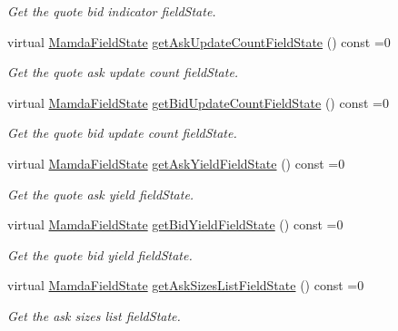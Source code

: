 \begin{CompactItemize}
\begin{CompactList}\small\item\em Get the quote bid indicator field\-State. \item\end{CompactList}\item 
virtual \hyperlink{namespaceWombat_93aac974f2ab713554fd12a1fa3b7d2a}{Mamda\-Field\-State} \hyperlink{classWombat_1_1MamdaQuoteRecap_c9fddc7ecb8d6b3cccd075b95917d2e2}{get\-Ask\-Update\-Count\-Field\-State} () const =0
\begin{CompactList}\small\item\em Get the quote ask update count field\-State. \item\end{CompactList}\item 
virtual \hyperlink{namespaceWombat_93aac974f2ab713554fd12a1fa3b7d2a}{Mamda\-Field\-State} \hyperlink{classWombat_1_1MamdaQuoteRecap_a1fde4201397013b41115b90913c4f06}{get\-Bid\-Update\-Count\-Field\-State} () const =0
\begin{CompactList}\small\item\em Get the quote bid update count field\-State. \item\end{CompactList}\item 
virtual \hyperlink{namespaceWombat_93aac974f2ab713554fd12a1fa3b7d2a}{Mamda\-Field\-State} \hyperlink{classWombat_1_1MamdaQuoteRecap_ef5f4c7d1f09607a9730da3dc5c782d6}{get\-Ask\-Yield\-Field\-State} () const =0
\begin{CompactList}\small\item\em Get the quote ask yield field\-State. \item\end{CompactList}\item 
virtual \hyperlink{namespaceWombat_93aac974f2ab713554fd12a1fa3b7d2a}{Mamda\-Field\-State} \hyperlink{classWombat_1_1MamdaQuoteRecap_015aa2464a9035bc0fc46e8b22464b2d}{get\-Bid\-Yield\-Field\-State} () const =0
\begin{CompactList}\small\item\em Get the quote bid yield field\-State. \item\end{CompactList}\item 
virtual \hyperlink{namespaceWombat_93aac974f2ab713554fd12a1fa3b7d2a}{Mamda\-Field\-State} \hyperlink{classWombat_1_1MamdaQuoteRecap_c159beb494cd9e208bf472bd4af0c194}{get\-Ask\-Sizes\-List\-Field\-State} () const =0
\begin{CompactList}\small\item\em Get the ask sizes list field\-State. \item\end{CompactList}\item 

\end{CompactItemize}
